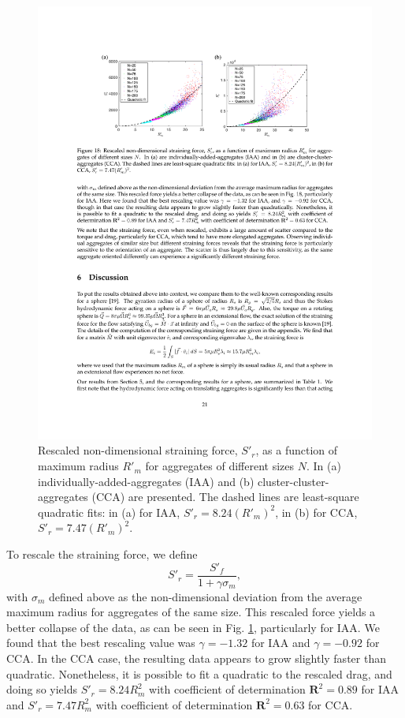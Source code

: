 \begin{figure}[ht]
	\begin{center}
		\includegraphics[scale = 1.0]{./figures/fig_strain_all_rescaledprime.pdf}
	\end{center}
	\caption{Rescaled non-dimensional straining force, $S'_r$, as a function of maximum radius $R'_m$ for aggregates of different sizes $N$. In (a) individually-added-aggregates (IAA) and (b) cluster-cluster-aggregates (CCA) are presented. The dashed lines are least-square quadratic fits: in (a) for IAA, $S'_r = 8.24  (R'_m)^2 $, in (b) for CCA, $S'_r = 7.47 (R'_m)^2 $. }
	\label{fig_strain_maxR_rescaled}
\end{figure}


To rescale the straining force, we define
\[
S'_r = \frac{S'_f}{1 + \gamma \sigma_m},
\label{eq_strain_rescaled}
\]
with $\sigma_m$ defined above as the non-dimensional deviation from the average maximum radius for aggregates of the same size.
This rescaled force yields a better collapse of the data, as can be seen in Fig. \ref{fig_strain_maxR_rescaled}, particularly for IAA. We found that the best rescaling value was $\gamma = -1.32$ for  IAA and $\gamma= -0.92$ for  CCA.  In the CCA case, the resulting data appears to grow slightly faster than quadratic. Nonetheless, it is possible to fit a quadratic to the rescaled drag, and doing so yields $S'_r = 8.24 R_m^2 $ with coefficient of determination $\mathbf{R}^2=0.89$ for IAA and $S'_r = 7.47 R_m^2 $ with coefficient of determination $\mathbf{R}^2=0.63$ for CCA. 


